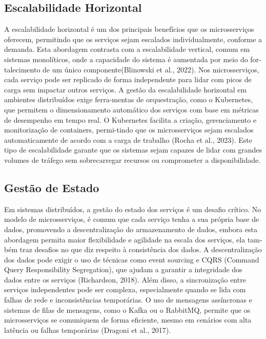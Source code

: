 \subsection{Escalabilidade Horizontal}

A escalabilidade horizontal é um dos principais benefícios que os microsserviços oferecem, permitindo que os serviços sejam escalados individualmente, conforme a demanda. Esta abordagem contrasta com a escalabilidade vertical, comum em sistemas monolíticos, onde a capacidade do sistema é aumentada por meio do for-talecimento de um único componente(Blinowski et al., 2022). Nos microsserviços, cada serviço pode ser replicado de forma independente para lidar com picos de carga sem impactar outros serviços.
A gestão da escalabilidade horizontal em ambientes distribuídos exige ferra-mentas de orquestração, como o Kubernetes, que permitem o dimensionamento automático dos serviços com base em métricas de desempenho em tempo real. O Kubernetes facilita a criação, gerenciamento e monitorização de containers, permi-tindo que os microsserviços sejam escalados automaticamente de acordo com a carga de trabalho (Rocha et al., 2023). Este tipo de escalabilidade garante que os sistemas sejam capazes de lidar com grandes volumes de tráfego sem sobrecarregar recursos ou comprometer a disponibilidade.

\subsection{Gestão de Estado}

Em sistemas distribuídos, a gestão do estado dos serviços é um desafio crítico. No modelo de microsserviços, é comum que cada serviço tenha a sua própria base de dados, promovendo a descentralização do armazenamento de dados, embora esta abordagem permita maior flexibilidade e agilidade na escala dos serviços, ela tam-bém traz desafios no que diz respeito à consistência dos dados. A descentralização dos dados pode exigir o uso de técnicas como event sourcing e CQRS (Command Query Responsibility Segregation), que ajudam a garantir a integridade dos dados entre os serviços (Richardson, 2018).
Além disso, a sincronização entre serviços independentes pode ser complexa, especialmente quando se lida com falhas de rede e inconsistências temporárias. O uso de mensagens assíncronas e sistemas de filas de mensagens, como o Kafka ou o RabbitMQ, permite que os microsserviços se comuniquem de forma eficiente, mesmo em cenários com alta latência ou falhas temporárias (Dragoni et al., 2017).


